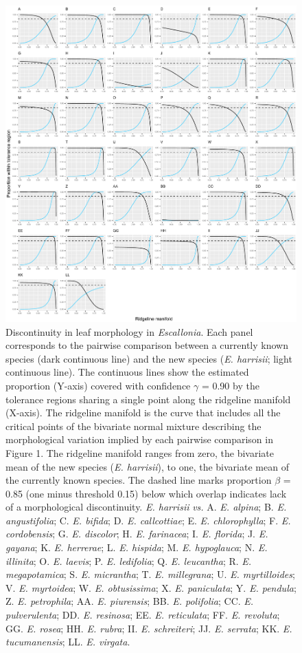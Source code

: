 \documentclass[fleqn,10pt,lineno]{wlpeerj} %
\begin{document}
\begin{figure}[ht]
\centering
\includegraphics[width=\linewidth]{Figure2}
\caption{Discontinuity in leaf morphology in \emph{Escallonia}. Each panel corresponds to the pairwise comparison between a currently known species (dark continuous line) and the new species (\emph{E. harrisii}; light continuous line). The continuous lines show the estimated proportion (Y-axis) covered with confidence $\gamma$ = 0.90 by the tolerance regions sharing a single point along the ridgeline manifold (X-axis). The ridgeline manifold is the curve that includes all the critical points of the bivariate normal mixture describing the morphological variation implied by each pairwise comparison in Figure 1. The ridgeline manifold ranges from zero, the bivariate mean of the new species (\emph{E. harrisii}), to one, the bivariate mean of the currently known species. The dashed line marks proportion $\beta$ = 0.85 (one minus threshold 0.15) below which overlap indicates lack of a morphological discontinuity. \emph{E. harrisii} \emph{vs.} A. \emph{E. alpina}; B. \emph{E. angustifolia}; C. \emph{E. bifida}; D. \emph{E. callcottiae}; E. \emph{E. chlorophylla}; F. \emph{E. cordobensis}; G. \emph{E. discolor}; H. \emph{E. farinacea}; I. \emph{E. florida}; J. \emph{E. gayana}; K. \emph{E. herrerae}; L. \emph{E. hispida}; M. \emph{E. hypoglauca}; N. \emph{E. illinita}; O. \emph{E. laevis}; P. \emph{E. ledifolia}; Q. \emph{E. leucantha}; R. \emph{E. megapotamica}; S. \emph{E. micrantha}; T. \emph{E. millegrana}; U. \emph{E. myrtilloides}; V. \emph{E. myrtoidea}; W. \emph{E. obtusissima}; X. \emph{E. paniculata}; Y. \emph{E. pendula}; Z. \emph{E. petrophila}; AA. \emph{E. piurensis}; BB. \emph{E. polifolia}; CC. \emph{E. pulverulenta}; DD. \emph{E. resinosa}; EE. \emph{E. reticulata}; FF. \emph{E. revoluta}; GG. \emph{E. rosea}; HH. \emph{E. rubra}; II. \emph{E. schreiteri}; JJ. \emph{E. serrata};  KK. \emph{E. tucumanensis}; LL. \emph{E. virgata}.}

\end{figure}
\end{document}
